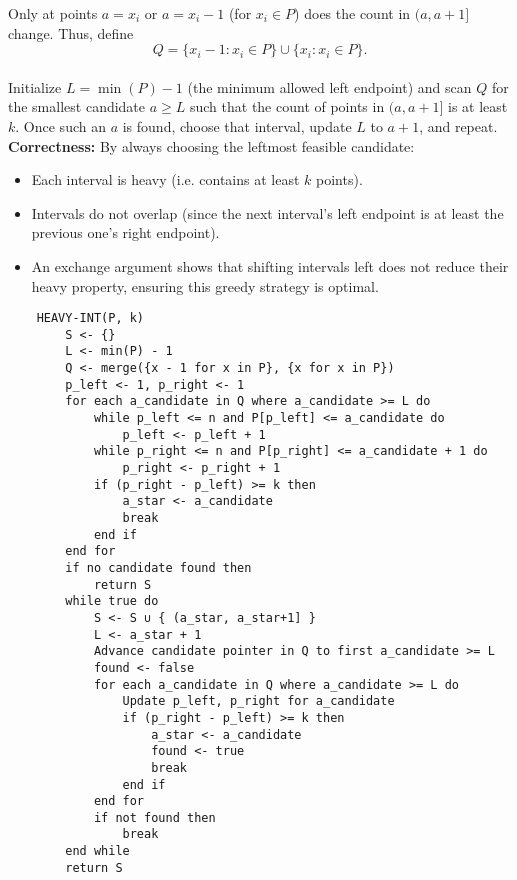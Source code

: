 \documentclass[letterpaper, 11pt]{article}
\newcommand{\1}{\mathds{1}}	%
\theoremstyle{definition}
\newenvironment{solution}{{\par\noindent\it Solution.}}{}
\begin{document}
\begin{solution}
       Only at points \(a = x_i\) or \(a = x_i-1\) (for \(x_i\in P\)) does the count in \((a,a+1]\) change. Thus, define
        \[
        Q = \{x_i-1 : x_i \in P\} \cup \{x_i : x_i \in P\}.
        \]
    \\Initialize \(L=\min(P)-1\) (the minimum allowed left endpoint) and scan \(Q\) for the smallest candidate \(a \ge L\) such that the count of points in \((a, a+1]\) is at least \(k\). Once such an \(a\) is found, choose that interval, update \(L\) to \(a+1\), and repeat.
\\ \textbf{Correctness:} By always choosing the leftmost feasible candidate:
        \begin{itemize}
            \item Each interval is heavy (i.e. contains at least \(k\) points).
            \item Intervals do not overlap (since the next interval's left endpoint is at least the previous one's right endpoint).
            \item An exchange argument shows that shifting intervals left does not reduce their heavy property, ensuring this greedy strategy is optimal.
        \end{itemize}
    
    \begin{lstlisting}
    HEAVY-INT(P, k)
        S <- {}            
        L <- min(P) - 1     
        Q <- merge({x - 1 for x in P}, {x for x in P})
        p_left <- 1, p_right <- 1
        for each a_candidate in Q where a_candidate >= L do
            while p_left <= n and P[p_left] <= a_candidate do
                p_left <- p_left + 1
            while p_right <= n and P[p_right] <= a_candidate + 1 do
                p_right <- p_right + 1
            if (p_right - p_left) >= k then
                a_star <- a_candidate
                break
            end if
        end for
        if no candidate found then
            return S
        while true do
            S <- S ∪ { (a_star, a_star+1] }
            L <- a_star + 1
            Advance candidate pointer in Q to first a_candidate >= L
            found <- false
            for each a_candidate in Q where a_candidate >= L do
                Update p_left, p_right for a_candidate
                if (p_right - p_left) >= k then
                    a_star <- a_candidate
                    found <- true
                    break
                end if
            end for
            if not found then
                break
        end while
        return S
    \end{lstlisting}
    
\end{solution}
\newpage
\end{document}
